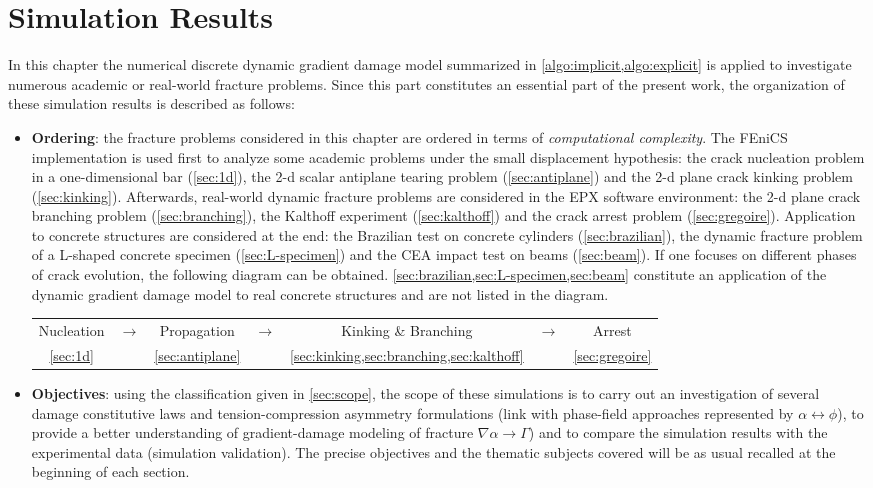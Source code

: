 \chapter{Simulation Results} \label{chap:simulation}
\minitoc

In this chapter the numerical discrete dynamic gradient damage model summarized in \cref{algo:implicit,algo:explicit} is applied to investigate numerous academic or real-world fracture problems. Since this part constitutes an essential part of the present work, the organization of these simulation results is described as follows:
\begin{itemize}
\item \textbf{Ordering}: the fracture problems considered in this chapter are ordered in terms of \emph{computational complexity}. The FEniCS implementation is used first to analyze some academic problems under the small displacement hypothesis: the crack nucleation problem in a one-dimensional bar (\cref{sec:1d}), the 2-d scalar antiplane tearing problem (\cref{sec:antiplane}) and the 2-d plane crack kinking problem (\cref{sec:kinking}). Afterwards, real-world dynamic fracture problems are considered in the EPX software environment: the 2-d plane crack branching problem (\cref{sec:branching}), the Kalthoff experiment (\cref{sec:kalthoff}) and the crack arrest problem (\cref{sec:gregoire}). Application to concrete structures are considered at the end: the Brazilian test on concrete cylinders (\cref{sec:brazilian}), the dynamic fracture problem of a L-shaped concrete specimen (\cref{sec:L-specimen}) and the CEA impact test on beams (\cref{sec:beam}). If one focuses on different phases of crack evolution, the following diagram can be obtained. \cref{sec:brazilian,sec:L-specimen,sec:beam} constitute an application of the dynamic gradient damage model to real concrete structures and are not listed in the diagram.
\begin{center}
\begin{tabular}{ccccccc}
Nucleation &$\to$& Propagation &$\to$& Kinking \& Branching &$\to$& Arrest \\
\cref{sec:1d} && \cref{sec:antiplane} && \cref{sec:kinking,sec:branching,sec:kalthoff} && \cref{sec:gregoire}
\end{tabular}
\end{center}

\item \textbf{Objectives}: using the classification given in \cref{sec:scope}, the scope of these simulations is to carry out an investigation of several damage constitutive laws and tension-compression asymmetry formulations (link with phase-field approaches represented by $\alpha\leftrightarrow\phi$), to provide a better understanding of gradient-damage modeling of fracture $\nabla\alpha\to\Gamma$) and to compare the simulation results with the experimental data (simulation validation). The precise objectives and the thematic subjects covered will be as usual recalled at the beginning of each section.
\end{itemize}

